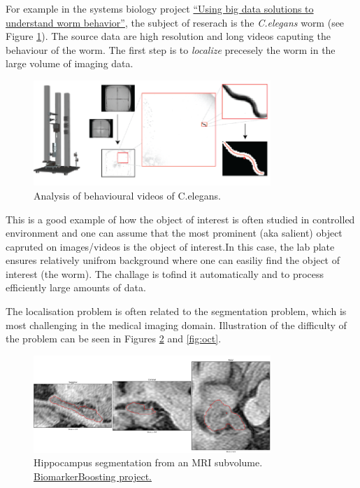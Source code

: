 For example in the systems biology project \href{https://blog.surf.nl/en/eyr4-blog-5-using-big-data-solutions-to-understand-worm-behavior/}{``Using big data solutions to understand worm behavior''}, the subject of reserach is the {\em C.elegans} worm (see Figure \ref{fig:Celegans}). The source data are high resolution and long videos caputing the behaviour of the worm. The first step is to {\em localize} precesely the worm in the large volume of imaging data. 
\begin{figure}[H]
\begin{center}
\includegraphics[width=0.8\textwidth]{fig/Celegans}
\end{center}
\caption{ Analysis of behavioural videos of C.elegans.}
\label{fig:Celegans}
\end{figure}
This is a good example of how the object of interest is often studied in controlled environment and one can assume that the most prominent (aka salient) object capruted on images/videos is the object of interest.In this case, the lab plate ensures relatively unifrom background where one can easiliy find the object of interest (the worm). The challage is tofind it automatically and to process efficiently large amounts of data.

The localisation problem is often related to the segmentation problem, which is most challenging in the medical imaging domain. Illustration of the difficulty of the problem can be seen in Figures \ref{fig:hippo} and \ref{fig:oct}.

\begin{figure}[H]
\begin{center}
\includegraphics[width=0.8\textwidth]{fig/hippo}
\end{center}
\caption{Hippocampus segmentation from an MRI subvolume. \href{https://www.esciencecenter.nl/project/biomarker-boosting}{BiomarkerBoosting project.}}
\label{fig:hippo}
\end{figure}


